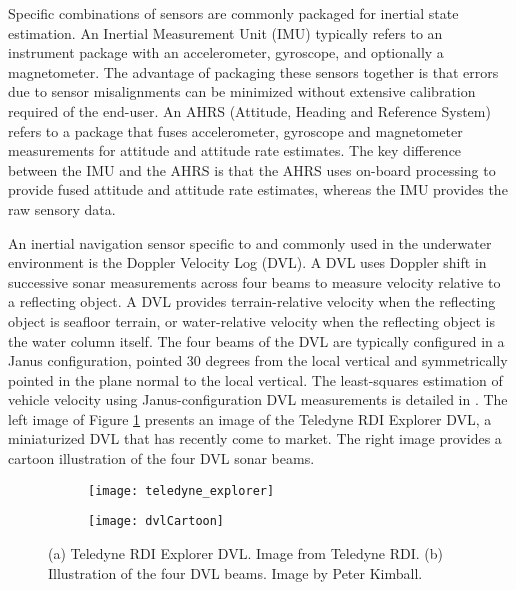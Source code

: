 Specific combinations of sensors are commonly packaged for inertial state estimation.  An Inertial Measurement Unit (IMU) typically refers to an instrument package with an accelerometer, gyroscope, and optionally a magnetometer.  The advantage of packaging these sensors together is that errors due to sensor misalignments can be minimized without extensive calibration required of the end-user.  An AHRS (Attitude, Heading and Reference System) refers to a package that fuses accelerometer, gyroscope and magnetometer measurements for attitude and attitude rate estimates.  The key difference between the IMU and the AHRS is that the AHRS uses on-board processing to provide fused attitude and attitude rate estimates, whereas the IMU provides the raw sensory data.

An inertial navigation sensor specific to and commonly used in the underwater environment is the Doppler Velocity Log (DVL).  A DVL uses Doppler shift in successive sonar measurements across four beams to measure velocity relative to a reflecting object.  A DVL provides terrain-relative velocity when the reflecting object is seafloor terrain, or water-relative velocity when the reflecting object is the water column itself.  The four beams of the DVL are typically configured in a Janus configuration, pointed 30 degrees from the local vertical and symmetrically pointed in the plane normal to the local vertical. The least-squares estimation of vehicle velocity using Janus-configuration DVL measurements is detailed in \cite{Brokloff97}.  The left image of Figure \ref{fig:teledyne_explorer} presents an image of the Teledyne RDI Explorer DVL, a miniaturized DVL that has recently come to market.  The right image provides a cartoon illustration of the four DVL sonar beams.

\begin{figure}[!h]
	\centering
	\begin{subfigure}[b]{0.45\textwidth}
		\texttt{[image: teledyne\_explorer]}
		\caption{}
         \end{subfigure}
         \centering
         \begin{subfigure}[b]{0.42\textwidth}
         	\texttt{[image: dvlCartoon]}
         	\caption{}
	\end{subfigure}
	\caption{(a) Teledyne RDI Explorer DVL.  Image from Teledyne RDI.  (b) Illustration of the four DVL beams. Image by Peter Kimball.}
	\label{fig:teledyne_explorer}
\end{figure}

